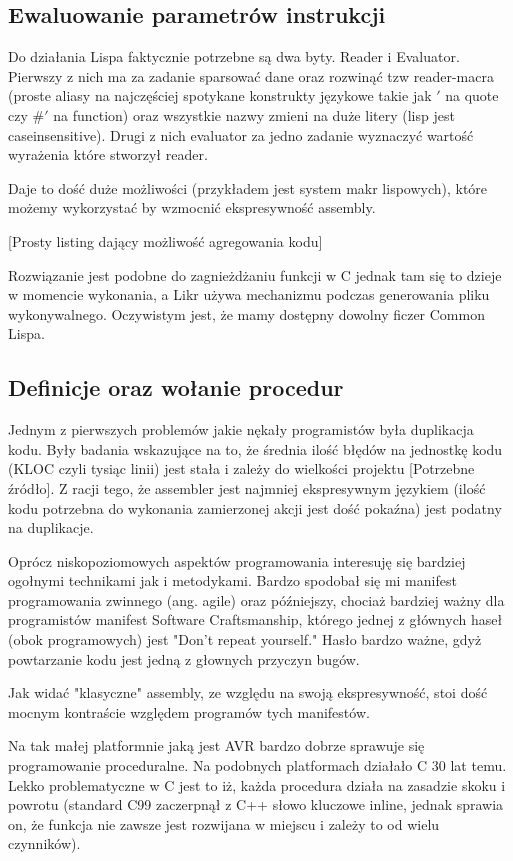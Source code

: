 \documentclass[11pt]{article}
\begin{document}
\subsection{Ewaluowanie parametrów instrukcji}

Do działania Lispa faktycznie potrzebne są dwa byty. Reader i Evaluator. Pierwszy z nich ma za zadanie sparsować dane oraz rozwinąć tzw reader-macra (proste aliasy na najczęściej spotykane konstrukty językowe takie jak $'$ na quote czy $\#'$ na function) oraz wszystkie nazwy zmieni na duże litery (lisp jest caseinsensitive). Drugi z nich  evaluator za jedno zadanie wyznaczyć wartość wyrażenia które stworzył reader. 

Daje to dość duże możliwości (przykładem jest system makr lispowych), które możemy wykorzystać by wzmocnić ekspresywność assembly. 

[Prosty listing dający możliwość agregowania kodu]

Rozwiązanie jest podobne do zagnieżdżaniu funkcji w C jednak tam się to dzieje w momencie wykonania, a Likr używa mechanizmu podczas generowania pliku wykonywalnego. Oczywistym jest, że mamy dostępny dowolny ficzer Common Lispa.

\subsection{Definicje oraz wołanie procedur}

Jednym z pierwszych problemów jakie nękały programistów była duplikacja kodu. Były badania wskazujące na to, że  średnia ilość błędów na jednostkę kodu (KLOC czyli tysiąc linii) jest stała i zależy do wielkości projektu [Potrzebne źródło]. Z racji tego, że assembler jest najmniej ekspresywnym językiem (ilość kodu potrzebna do wykonania zamierzonej akcji jest dość pokaźna) jest podatny na duplikacje.

Oprócz niskopoziomowych aspektów programowania interesuję się bardziej ogołnymi technikami jak i metodykami. Bardzo spodobał się mi manifest programowania zwinnego (ang. agile) oraz późniejszy, chociaż bardziej ważny dla programistów manifest Software Craftsmanship, którego jednej z głównych haseł (obok programowych) jest "Don't repeat yourself." Hasło bardzo ważne, gdyż powtarzanie kodu jest jedną z głownych przyczyn bugów. 

Jak widać "klasyczne" assembly, ze względu na swoją ekspresywność, stoi dość mocnym kontraście względem
programów tych manifestów. 

Na tak małej platformnie jaką jest AVR bardzo dobrze sprawuje się programowanie proceduralne. Na podobnych platformach działało C 30 lat temu. Lekko problematyczne w C jest to iż, każda procedura działa na zasadzie skoku i powrotu (standard C99 zaczerpnął z C++ słowo kluczowe inline, jednak sprawia on, że funkcja nie zawsze jest rozwijana w miejscu i zależy to od wielu czynników). 
\end{document}
